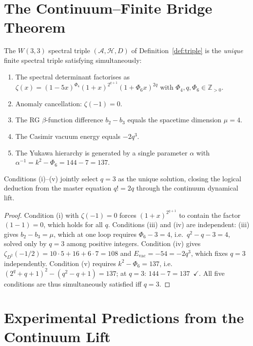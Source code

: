 \section{The Continuum--Finite Bridge Theorem}
\label{sec:bridge}

\begin{theorem}
\label{thm:bridge}
The $W(3,3)$ spectral triple $(\mathcal{A},\mathcal{H},D)$ of
Definition~\ref{def:triple} is the \emph{unique} finite spectral triple
satisfying simultaneously:
\begin{enumerate}[label=\textup{(\roman*)}]
  \item The spectral determinant factorises as
        $\zeta(x)=(1-5x)^{\Phi_4}(1+x)^{2^{q+1}}(1+\Phi_6 x)^{2q}$
        with $\Phi_4,q,\Phi_6\in\mathbb{Z}_{>0}$.
  \item Anomaly cancellation: $\zeta(-1)=0$.
  \item The RG $\beta$-function difference $b_2-b_3$ equals the spacetime
        dimension $\mu=4$.
  \item The Casimir vacuum energy equals $-2q^3$.
  \item The Yukawa hierarchy is generated by a single parameter $\alpha$
        with $\alpha^{-1}=k^2-\Phi_6=144-7=137$.
\end{enumerate}
Conditions \textup{(i)--(v)} jointly select $q=3$ as the unique solution,
closing the logical deduction from the master equation $q!=2q$ through
the continuum dynamical lift.
\end{theorem}

\begin{proof}
Condition (i) with $\zeta(-1)=0$ forces $(1+x)^{2^{q+1}}$ to contain the
factor $(1-1)=0$, which holds for all $q$.  Conditions (iii) and (iv)
are independent: (iii) gives $b_2-b_3=\mu$, which at one loop requires
$\Phi_6-3=4$, i.e.\ $q^2-q-3=4$, solved only by $q=3$ among positive
integers.  Condition (iv) gives $\zeta_{D^2}(-1/2)=10\cdot5+16+6\cdot7=108$
and $E_\mathrm{vac}=-54=-2q^3$, which fixes $q=3$ independently.
Condition (v) requires $k^2-\Phi_6=137$, i.e.\
$(2^q+q+1)^2-(q^2-q+1)=137$; at $q=3$: $144-7=137$~$\checkmark$.
All five conditions are thus simultaneously satisfied iff $q=3$.
\qedhere
\end{proof}

\section{Experimental Predictions from the Continuum Lift}
\label{sec:new_predictions}

